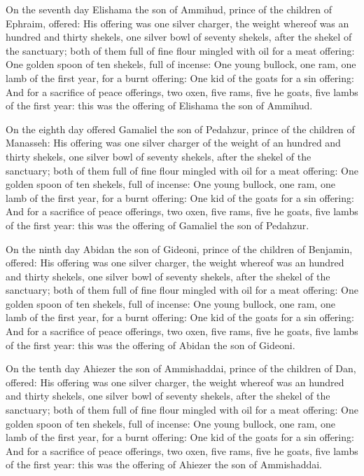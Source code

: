  On the seventh day Elishama the son of Ammihud, prince
of the children of Ephraim, offered:  His offering was one
silver charger, the weight whereof was an hundred and thirty shekels,
one silver bowl of seventy shekels, after the shekel of the sanctuary;
both of them full of fine flour mingled with oil for a meat offering:
 One golden spoon of ten shekels, full of incense:
 One young bullock, one ram, one lamb of the first year,
for a burnt offering:  One kid of the goats for a sin
offering:  And for a sacrifice of peace offerings, two
oxen, five rams, five he goats, five lambs of the first year: this was
the offering of Elishama the son of Ammihud.

 On the eighth day offered Gamaliel the son of Pedahzur,
prince of the children of Manasseh:  His offering was one
silver charger of the weight of an hundred and thirty shekels, one
silver bowl of seventy shekels, after the shekel of the sanctuary; both
of them full of fine flour mingled with oil for a meat offering:
 One golden spoon of ten shekels, full of incense:
 One young bullock, one ram, one lamb of the first year,
for a burnt offering:  One kid of the goats for a sin
offering:  And for a sacrifice of peace offerings, two
oxen, five rams, five he goats, five lambs of the first year: this was
the offering of Gamaliel the son of Pedahzur.

 On the ninth day Abidan the son of Gideoni, prince of
the children of Benjamin, offered:  His offering was one
silver charger, the weight whereof was an hundred and thirty shekels,
one silver bowl of seventy shekels, after the shekel of the sanctuary;
both of them full of fine flour mingled with oil for a meat offering:
 One golden spoon of ten shekels, full of incense:
 One young bullock, one ram, one lamb of the first year,
for a burnt offering:  One kid of the goats for a sin
offering:  And for a sacrifice of peace offerings, two
oxen, five rams, five he goats, five lambs of the first year: this was
the offering of Abidan the son of Gideoni.

 On the tenth day Ahiezer the son of Ammishaddai, prince
of the children of Dan, offered:  His offering was one
silver charger, the weight whereof was an hundred and thirty shekels,
one silver bowl of seventy shekels, after the shekel of the sanctuary;
both of them full of fine flour mingled with oil for a meat offering:
 One golden spoon of ten shekels, full of incense:
 One young bullock, one ram, one lamb of the first year,
for a burnt offering:  One kid of the goats for a sin
offering:  And for a sacrifice of peace offerings, two
oxen, five rams, five he goats, five lambs of the first year: this was
the offering of Ahiezer the son of Ammishaddai.

